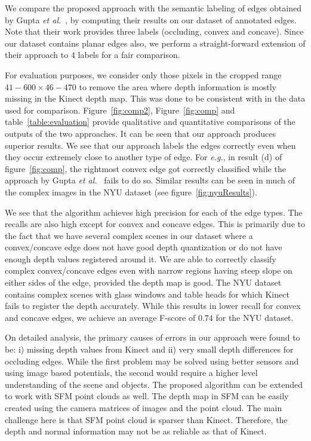 We compare the proposed approach with the semantic labeling of edges obtained by 
Gupta {\em et al.}~\cite{gupta13Perceptual}, by computing their results on our dataset of annotated 
edges. Note that their work provides three labels (occluding, convex and concave). Since our dataset 
contains planar edges also, we perform a straight-forward extension of their approach to $4$ labels 
for a fair comparison.

For evaluation purposes, we consider only those pixels in the cropped range $41-600\times46-470$ to 
remove the area where depth information is mostly missing in the Kinect depth map. This was done to 
be consistent with \cite{gupta13Perceptual} in the data used for comparison. Figure~\ref{fig:comp2}, 
Figure~\ref{fig:comp} and table~\ref{table:evaluation} provide qualitative and quantitative comparisons 
of the outputs of the two approaches. It can be seen that our approach produces superior results. 
We see that our approach labels the edges correctly even when they occur extremely close to another type of edge. For \textit{e.g.}, in result (d) of figure~\ref{fig:comp}, the rightmost convex edge got correctly 
classified while the approach by Gupta {\em et al.}~\cite{gupta13Perceptual} fails to do so. Similar results 
can be seen in much of the complex images in the NYU dataset (see figure~\ref{fig:nyuResults}). 

We see that the algorithm achieves high precision for each of the edge types. The recalls are also 
high except for convex and concave edges. This is primarily due to the fact that we have several complex 
scenes in our dataset where a convex/concave edge does not have good depth quantization or do not have 
enough depth values registered around it. We are able to correctly classify complex convex/concave edges 
even with narrow regions having steep slope on either sides of the edge, provided the depth map is good. 
The NYU dataset contains complex scenes with glass windows and table heads for which Kinect fails to 
register the depth accurately. While this results in lower recall for convex and concave edges, we 
achieve an average F-score of $0.74$ for the NYU dataset.

On detailed analysis, the primary causes of errors in our approach were found to be: i) missing depth 
values from Kinect and ii) very small depth differences for occluding edges. While the first problem may 
be solved using better sensors and using image based potentials, the second would require a higher level 
understanding of the scene and objects. The proposed algorithm can be extended to work with SFM point 
clouds as well. The depth map in SFM can be easily created using the camera matrices of images and the 
point cloud. The main challenge here is that SFM point cloud is sparser than Kinect. Therefore, the depth 
and normal information may not be as reliable as that of Kinect.

